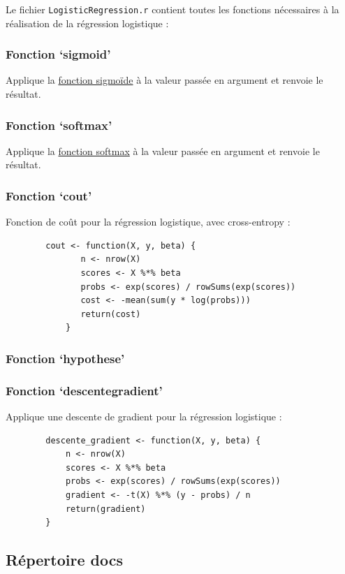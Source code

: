 \documentclass[10pt,french]{report}
\begin{document}
	Le fichier \texttt{LogisticRegression.r} contient toutes les fonctions nécessaires à la réalisation de la régression logistique :
	
	\subsubsection{Fonction \enquote*{sigmoid}}
	Applique la \hyperref[fonction sigmoïde]{fonction sigmoïde} à la valeur passée en argument et renvoie le résultat.
	
	\subsubsection{Fonction \enquote*{softmax}}
	Applique la \hyperref[fonction softmax]{fonction softmax} à la valeur passée en argument et renvoie le résultat.
	
	\subsubsection{Fonction \enquote*{cout}}	
	Fonction de coût pour la régression logistique, avec cross-entropy :
	
	\begin{verbatim}
		cout <- function(X, y, beta) {
			   n <- nrow(X)
			   scores <- X %*% beta
			   probs <- exp(scores) / rowSums(exp(scores))
			   cost <- -mean(sum(y * log(probs)))
			   return(cost)
		    }
	\end{verbatim}
	
	\subsubsection{Fonction \enquote*{hypothese}}
	
	\subsubsection{Fonction \enquote*{descente\textunderscore gradient}}
	
	Applique une descente de gradient pour la régression logistique :
	\begin{verbatim}
		descente_gradient <- function(X, y, beta) {
			n <- nrow(X)
			scores <- X %*% beta
			probs <- exp(scores) / rowSums(exp(scores))
			gradient <- -t(X) %*% (y - probs) / n
			return(gradient)
		}
	\end{verbatim}
	
	\subsection{Répertoire docs}
	
\end{document}
